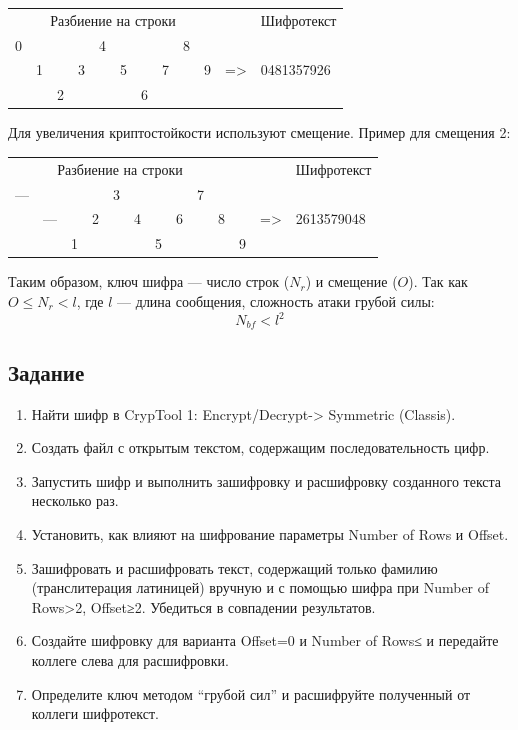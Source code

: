 \documentclass[a4paper, 14pt]{extarticle}
\begin{document}
\begin{tabularx}{0.8\textwidth}{XXXXXXXXXXXX}
\multicolumn{10}{c}{Разбиение на строки} &  & Шифротекст \\
0 &  &  &  & 4 &  &  &  & 8 &  &  &  \\
 & 1 &  & 3 &  & 5 &  & 7 &  & 9 & =\textgreater{} & 0481357926 \\
 &  & 2 &  &  &  & 6 &  &  &  &  & 
\end{tabularx}

Для увеличения криптостойкости используют смещение. Пример для смещения 2:

\begin{tabularx}{0.8\textwidth}{XXXXXXXXXXXXX}
\multicolumn{10}{c}{Разбиение на строки} &  &  & Шифротекст \\
--- &  &  &  & 3 &  &  &  & 7 &  &  &  &  \\
 & --- &  & 2 &  & 4 &  & 6 &  & 8 &  & =\textgreater{} & 2613579048 \\
 &  & 1 &  &  &  & 5 &  &  &  & 9 &  & 
\end{tabularx}

Таким образом, ключ шифра --- число строк ($N_r$) и смещение ($O$). Так как $ O \le N_r < l$, где $l$ --- длина сообщения, сложность атаки грубой силы:
\begin{equation}
    N_{bf} < l^2
\end{equation}

\subsection{Задание}
\begin{enumerate}
    \item Найти шифр в CrypTool 1: Encrypt/Decrypt-> Symmetric (Classis).
    \item Создать файл с открытым текстом, содержащим последовательность цифр.
    \item Запустить шифр и выполнить зашифровку и расшифровку созданного текста несколько раз.
    \item Установить, как влияют на шифрование параметры Number of Rows и Offset.
    \item Зашифровать и расшифровать текст, содержащий только фамилию (транслитерация латиницей) вручную и с помощью шифра при Number of Rows>2, Offset≥2. Убедиться в совпадении результатов.
    \item Создайте шифровку для варианта Offset=0 и Number of Rows≤ и передайте коллеге слева для расшифровки.
    \item Определите ключ методом ``грубой сил'' и расшифруйте полученный от коллеги шифротекст.
\end{enumerate}
\end{document}
